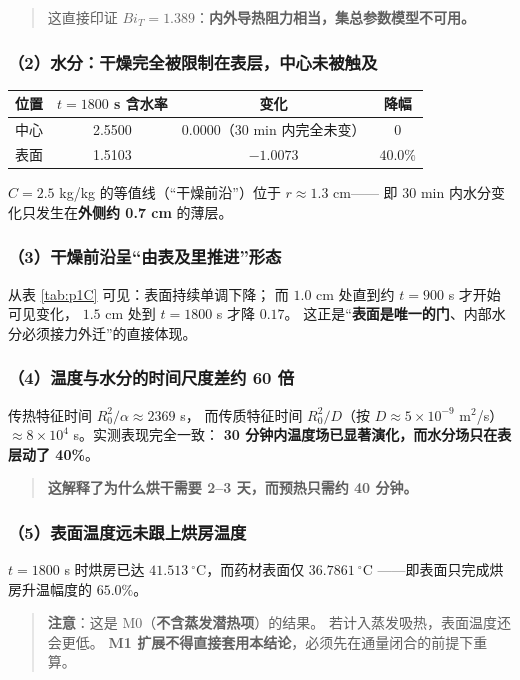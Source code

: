 \begin{quote}
  这直接印证 $Bi_T=1.389$：\textbf{内外导热阻力相当，集总参数模型不可用。}
\end{quote}

\subsubsection*{（2）水分：干燥完全被限制在表层，中心未被触及}

\begin{table}[H]
  \centering
  \footnotesize
  \begin{tabular}{@{}lccc@{}}
    \toprule
    位置 & $t=1800$ s 含水率 & 变化 & 降幅 \\
    \midrule
    中心 & 2.5500 & $\mathbf{0.0000}$（30 min 内完全未变） & 0 \\
    表面 & 1.5103 & $-1.0073$ & $\mathbf{40.0\%}$ \\
    \bottomrule
  \end{tabular}
\end{table}

$C=2.5$ kg/kg 的等值线（``干燥前沿''）位于 $r\approx1.3$ cm——
即 30 min 内水分变化只发生在\textbf{外侧约 0.7 cm} 的薄层。

\subsubsection*{（3）干燥前沿呈``由表及里推进''形态}

从表 \ref{tab:p1C} 可见：表面持续单调下降；
而 $1.0$ cm 处直到约 $t=900$ s 才开始可见变化，
$1.5$ cm 处到 $t=1800$ s 才降 $0.17$。
这正是``\textbf{表面是唯一的门}、内部水分必须接力外迁''的直接体现。

\subsubsection*{（4）温度与水分的时间尺度差约 60 倍}

传热特征时间 $R_0^{2}/\alpha\approx2369$ s，
而传质特征时间 $R_0^{2}/D$（按 $D\approx5\times10^{-9}$ m$^2$/s）
$\approx8\times10^{4}$ s。实测表现完全一致：
\textbf{30 分钟内温度场已显著演化，而水分场只在表层动了 40\%}。

\begin{quote}
  \textbf{这解释了为什么烘干需要 2--3 天，而预热只需约 40 分钟。}
\end{quote}

\subsubsection*{（5）表面温度远未跟上烘房温度}

$t=1800$ s 时烘房已达 $41.513\ ^\circ\mathrm{C}$，而药材表面仅 $36.7861\ ^\circ\mathrm{C}$
——即表面只完成烘房升温幅度的 $65.0\%$。

\begin{quote}
  \textbf{注意}：这是 M0（\textbf{不含蒸发潜热项}）的结果。
  若计入蒸发吸热，表面温度还会更低。
  \textbf{M1 扩展不得直接套用本结论}，必须先在通量闭合的前提下重算。
\end{quote}
